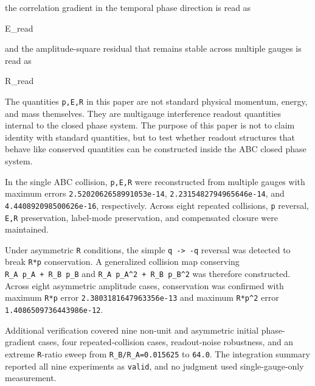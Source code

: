 \documentclass[
  a4paper,
]{article}
\newenvironment{Shaded}{}{}
\newcommand{\NormalTok}[1]{#1}
\begin{document}
the correlation gradient in the temporal phase direction is read as

\begin{Shaded}
\begin{Highlighting}[]
\NormalTok{E\_read}
\end{Highlighting}
\end{Shaded}

and the amplitude-square residual that remains stable across multiple
gauges is read as

\begin{Shaded}
\begin{Highlighting}[]
\NormalTok{R\_read}
\end{Highlighting}
\end{Shaded}

The quantities \texttt{p,E,R} in this paper are not standard physical
momentum, energy, and mass themselves. They are multigauge interference
readout quantities internal to the closed phase system. The purpose of
this paper is not to claim identity with standard quantities, but to
test whether readout structures that behave like conserved quantities
can be constructed inside the ABC closed phase system.

In the single ABC collision, \texttt{p,E,R} were reconstructed from
multiple gauges with maximum errors \texttt{2.5202062658991053e-14},
\texttt{2.2315482794965646e-14}, and \texttt{4.440892098500626e-16},
respectively. Across eight repeated collisions, \texttt{p} reversal,
\texttt{E,R} preservation, label-mode preservation, and compensated
closure were maintained.

Under asymmetric \texttt{R} conditions, the simple
\texttt{q\ -\textgreater{}\ -q} reversal was detected to break
\texttt{R*p} conservation. A generalized collision map conserving
\texttt{R\_A\ p\_A\ +\ R\_B\ p\_B} and
\texttt{R\_A\ p\_A\^{}2\ +\ R\_B\ p\_B\^{}2} was therefore constructed.
Across eight asymmetric amplitude cases, conservation was confirmed with
maximum \texttt{R*p} error \texttt{2.3803181647963356e-13} and maximum
\texttt{R*p\^{}2} error \texttt{1.4086509736443986e-12}.

Additional verification covered nine non-unit and asymmetric initial
phase-gradient cases, four repeated-collision cases, readout-noise
robustness, and an extreme \texttt{R}-ratio sweep from
\texttt{R\_B/R\_A=0.015625} to \texttt{64.0}. The integration summary
reported all nine experiments as \texttt{valid}, and no judgment used
single-gauge-only measurement.
\end{document}
